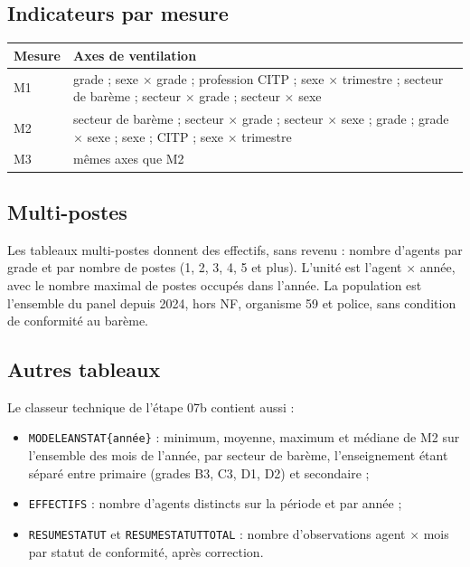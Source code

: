 \documentclass[12pt,a4paper,french]{article}
\renewcommand{\_}{\underscoreorigine\allowbreak}
\begin{document}
\subsection{Indicateurs par mesure}

\begin{center}
\begin{tabular}{p{2cm}p{12cm}}
    \toprule
    \textbf{Mesure} & \textbf{Axes de ventilation} \\
    \midrule
    M1 & grade ; sexe $\times$ grade ; profession CITP ; sexe $\times$ trimestre ; secteur de barème ; secteur $\times$ grade ; secteur $\times$ sexe \\
    \addlinespace
    M2 & secteur de barème ; secteur $\times$ grade ; secteur $\times$ sexe ; grade ; grade $\times$ sexe ; sexe ; CITP ; sexe $\times$ trimestre \\
    \addlinespace
    M3 & mêmes axes que M2 \\
    \bottomrule
\end{tabular}
\end{center}

\subsection{Multi-postes}

Les tableaux multi-postes donnent des effectifs, sans revenu : nombre d'agents par grade et par nombre de postes (1, 2, 3, 4, 5 et plus). L'unité est l'agent $\times$ année, avec le nombre maximal de postes occupés dans l'année. La population est l'ensemble du panel depuis 2024, hors NF, organisme 59 et police, sans condition de conformité au barème.

\subsection{Autres tableaux}

Le classeur technique de l'étape 07b contient aussi :

\begin{itemize}
    \item \texttt{MODELE\_ANSTAT\_\{année\}} : minimum, moyenne, maximum et médiane de M2 sur l'ensemble des mois de l'année, par secteur de barème, l'enseignement étant séparé entre primaire (grades B3, C3, D1, D2) et secondaire ;
    \item \texttt{EFFECTIFS\_*} : nombre d'agents distincts sur la période et par année ;
    \item \texttt{RESUME\_STATUT} et \texttt{RESUME\_STATUT\_TOTAL} : nombre d'observations agent $\times$ mois par statut de conformité, après correction.
\end{itemize}
\end{document}
